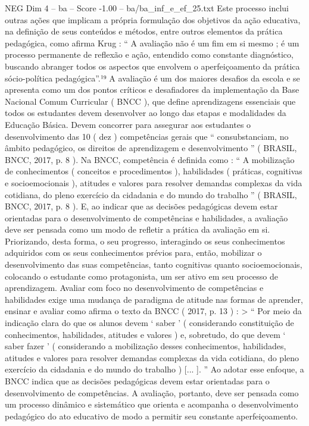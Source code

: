 \begin{textsample}{NEG Dim 4 – ba – Score -1.00 – ba/ba\_inf\_e\_ef\_25.txt}
Este processo inclui outras ações que implicam a própria formulação dos objetivos da ação educativa, na definição de seus conteúdos e métodos, entre outros elementos da prática pedagógica, como afirma Krug : “ A avaliação não é um fim em si mesmo ; é um processo permanente de reflexão e ação, entendido como constante diagnóstico, buscando abranger todos os aspectos que envolvem o aperfeiçoamento da prática sócio-política pedagógica”.¹⁹ A avaliação é um dos maiores desafios da escola e se apresenta como um dos pontos críticos e desafiadores da implementação da Base Nacional Comum Curricular ( BNCC ), que define aprendizagens essenciais que todos os estudantes devem desenvolver ao longo das etapas e modalidades da Educação Básica.
Devem concorrer para assegurar aos estudantes o desenvolvimento das 10 ( dez ) competências gerais que “ consubstanciam, no âmbito pedagógico, os direitos de aprendizagem e desenvolvimento ” ( BRASIL, BNCC, 2017, p. 8 ).
Na BNCC, competência é definida como : “ A mobilização de conhecimentos ( conceitos e procedimentos ), habilidades ( práticas, cognitivas e socioemocionais ), atitudes e valores para resolver demandas complexas da vida cotidiana, do pleno exercício da cidadania e do mundo do trabalho ” ( BRASIL, BNCC, 2017, p. 8 ).
E, ao indicar que as decisões pedagógicas devem estar orientadas para o desenvolvimento de competências e habilidades, a avaliação deve ser pensada como um modo de refletir a prática da avaliação em si.
Priorizando, desta forma, o seu progresso, interagindo os seus conhecimentos adquiridos com os seus conhecimentos prévios para, então, mobilizar o desenvolvimento das suas competências, tanto cognitivas quanto socioemocionais, colocando o estudante como protagonista, um ser ativo em seu processo de aprendizagem.
Avaliar com foco no desenvolvimento de competências e habilidades exige uma mudança de paradigma de atitude nas formas de aprender, ensinar e avaliar como afirma o texto da BNCC ( 2017, p. 13 ) : > “ Por meio da indicação clara do que os alunos devem ‘ saber ’ ( considerando constituição de conhecimentos, habilidades, atitudes e valores ) e, sobretudo, do que devem ‘ saber fazer ’ ( considerando a mobilização desses conhecimentos, habilidades, atitudes e valores para resolver demandas complexas da vida cotidiana, do pleno exercício da cidadania e do mundo do trabalho ) [... ]. ” Ao adotar esse enfoque, a BNCC indica que as decisões pedagógicas devem estar orientadas para o desenvolvimento de competências.
A avaliação, portanto, deve ser pensada como um processo dinâmico e sistemático que orienta e acompanha o desenvolvimento pedagógico do ato educativo de modo a permitir seu constante aperfeiçoamento.

\end{textsample}
